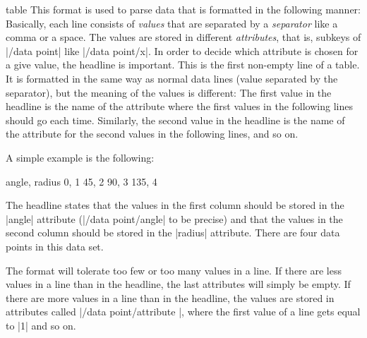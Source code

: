 \begin{dataformat}{table}
  This format is used to parse data that is formatted in the following
  manner: Basically, each line consists of \emph{values} that are
  separated by a \emph{separator} like a comma or a space. The values
  are stored in different \emph{attributes}, that is, subkeys of
  |/data point| like |/data point/x|. In order to decide which
  attribute is chosen for a give value, the headline is
  important. This is the first non-empty line of a table. It is
  formatted in the same way as normal data lines (value separated by
  the separator), but the meaning of the values is different: The
  first value in the headline is the name of the attribute where the
  first values in the following lines should go each time. Similarly,
  the second value in the headline is the name of the attribute for
  the second values in the following lines, and so on.

  A simple example is the following:
\begin{codeexample}
angle, radius
0, 1
45, 2
90, 3
135, 4
\end{codeexample}
  The headline states that the values in the first column should be
  stored in the |angle| attribute (|/data point/angle| to be precise)
  and that the values in the second column should be stored in the
  |radius| attribute. There are four data points in this data set.

  The format will tolerate too few or too many values in a line. If
  there are less values in a line than in the headline, the last
  attributes will simply be empty. If there are more values in a line
  than in the headline, the values are stored in attributes called
  |/data point/attribute |, where the first value
  of a line gets  equal to |1| and so on.


\end{dataformat}
